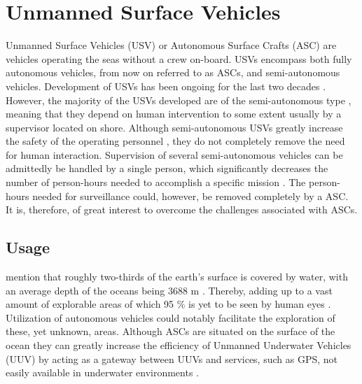 \chapter{Unmanned Surface Vehicles} %

\label{Unmanned_Surface_Vehicles} %


Unmanned Surface Vehicles (USV) or Autonomous Surface Crafts (ASC) are vehicles operating the seas without a crew on-board.
USVs encompass both fully autonomous vehicles, from now on referred to as ASCs, and semi-autonomous vehicles.
Development of USVs has been ongoing for the last two decades \cite{manley2008unmanned}.
However, the majority of the USVs developed are of the semi-autonomous type \cite{liu2016unmanned,park2017development}, meaning that they depend on human intervention to some extent usually by a supervisor located on shore.
Although semi-autonomous USVs greatly increase the safety of the operating personnel \cite{liu2016unmanned}, they do not completely remove the need for human interaction.
Supervision of several semi-autonomous vehicles can be admittedly be handled by a single person, which significantly decreases the number of person-hours needed to accomplish a specific mission \cite{manley2008unmanned}.
The person-hours needed for surveillance could, however, be removed completely by a ASC.
It is, therefore, of great interest to overcome the challenges associated with ASCs.


\section{Usage}

\textcite{Yuh2011} mention that roughly two-thirds of the earth's surface is covered by water, with an average depth of the oceans being 3688 m \cite{depth_ocean}.
Thereby, adding up to a vast amount of explorable areas of which 95 \% is yet to be seen by human eyes \cite{explored_percentage}. Utilization of autonomous vehicles could notably facilitate the  exploration of these, yet unknown, areas.  
Although ASCs are situated on the surface of the ocean they can greatly increase the efficiency of Unmanned Underwater Vehicles (UUV) by acting as a gateway between UUVs and services, such as GPS, not easily available in underwater environments \cite{liu2016unmanned}. 

